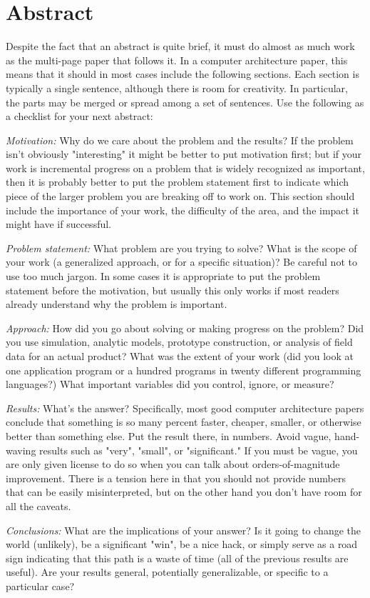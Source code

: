 \section*{Abstract}
\label{sec:abstract}

Despite the fact that an abstract is quite brief, it must do almost as much work as the multi-page paper that follows it.
In a computer architecture paper, this means that it should in most cases include the following sections.
Each section is typically a single sentence, although there is room for creativity. In particular, the parts may be merged or spread among a set of sentences.
Use the following as a checklist for your next abstract:

\textit{Motivation:}
Why do we care about the problem and the results? If the problem isn't obviously "interesting" it might be better to put motivation first;
but if your work is incremental progress on a problem that is widely recognized as important, then it is probably better to put the problem statement first to indicate which piece of the larger problem you are breaking off to work on.
This section should include the importance of your work, the difficulty of the area, and the impact it might have if successful.

\textit{Problem statement:}
What problem are you trying to solve? What is the scope of your work (a generalized approach, or for a specific situation)?
Be careful not to use too much jargon. In some cases it is appropriate to put the problem statement before the motivation, but usually this only works if most readers already understand why the problem is important.

\textit{Approach:}
How did you go about solving or making progress on the problem?
Did you use simulation, analytic models, prototype construction, or analysis of field data for an actual product? What was the extent of your work (did you look at one application program or a hundred programs in twenty different programming languages?)
What important variables did you control, ignore, or measure?

\textit{Results:}
What's the answer? Specifically, most good computer architecture papers conclude that something is so many percent faster, cheaper, smaller, or otherwise better than something else.
Put the result there, in numbers. Avoid vague, hand-waving results such as "very", "small", or "significant."
If you must be vague, you are only given license to do so when you can talk about orders-of-magnitude improvement.
There is a tension here in that you should not provide numbers that can be easily misinterpreted, but on the other hand you don't have room for all the caveats.

\textit{Conclusions:}
What are the implications of your answer? Is it going to change the world (unlikely), be a significant "win", be a nice hack, or simply serve as a road sign indicating that this path is a waste of time (all of the previous results are useful).
Are your results general, potentially generalizable, or specific to a particular case? \cite{how_to_write_an_abstract_1997}
